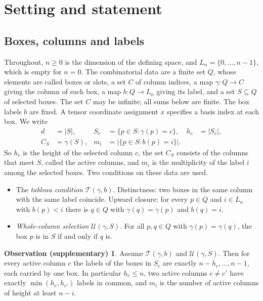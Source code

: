 \documentclass[11pt]{amsart}
\newcommand{\notlean}{supplementary}
\theoremstyle{definition}
\newtheorem*{observation}{Observation \textup{(\notlean)}}
\theoremstyle{remark}
\begin{document}
\section{Setting and statement}\label{sec:statement}

\subsection{Boxes, columns and labels}\label{sec:boxes}

Throughout, \(n\ge0\) is the dimension of the defining space, and \(L_n=\{0,\ldots,n-1\}\),
which is empty for \(n=0\). The combinatorial data are a finite set \(Q\),
whose elements are called boxes or slots, a set \(C\) of column indices, a map
\(\gamma:Q\to C\) giving the column of each box, a map \(b:Q\to L_n\) giving
its label, and a set \(S\subseteq Q\) of selected boxes. The set \(C\) may be
infinite; all sums below are finite. The box labels \(b\) are fixed. A tensor
coordinate assignment \(x\) specifies a basis index at each box. We write
\[
\begin{aligned}
d&=|S|,& S_c&=\{p\in S:\gamma(p)=c\},& h_c&=|S_c|,\\
C_S&=\gamma(S),& m_i&=|\{p\in S:b(p)=i\}| .
\end{aligned}
\]
So \(h_c\) is the height of the selected column \(c\), the set \(C_S\)
consists of the columns that meet \(S\), called the active columns, and
\(m_i\) is the multiplicity of the label \(i\) among the selected boxes. Two
conditions on these data are used.
\begin{itemize}
\item The \emph{tableau condition} \(\mathcal T(\gamma,b)\). Distinctness: two
  boxes in the same column with the same label coincide. Upward closure: for
  every \(p\in Q\) and \(i\in L_n\) with \(b(p)<i\) there is \(q\in Q\) with
  \(\gamma(q)=\gamma(p)\) and \(b(q)=i\).
\item \emph{Whole-column selection} \(\mathcal U(\gamma,S)\). For all
  \(p,q\in Q\) with \(\gamma(p)=\gamma(q)\), the box \(p\) is in \(S\) if and
  only if \(q\) is.
\end{itemize}

\begin{observation}
Assume \(\mathcal T(\gamma,b)\) and \(\mathcal U(\gamma,S)\). Then for every
active column \(c\) the labels of the boxes in \(S_c\) are exactly
\(n-h_c,\ldots,n-1\), each carried by one box. In particular \(h_c\le n\), two
active columns \(c\ne c'\) have exactly \(\min(h_c,h_{c'})\) labels in common,
and \(m_i\) is the number of active columns of height at least \(n-i\).
\end{observation}
\end{document}
